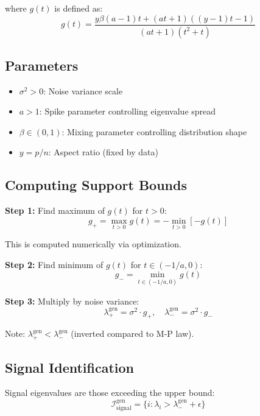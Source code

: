 \documentclass[12pt,a4paper]{article}
\begin{document}
where $g(t)$ is defined as:
\begin{equation}
g(t) = \frac{y\beta(a-1)t + (at+1)((y-1)t-1)}{(at+1)(t^2+t)}
\end{equation}

\subsection{Parameters}

\begin{itemize}
    \item $\sigma^2 > 0$: Noise variance scale
    \item $a > 1$: Spike parameter controlling eigenvalue spread
    \item $\beta \in (0, 1)$: Mixing parameter controlling distribution shape
    \item $y = p/n$: Aspect ratio (fixed by data)
\end{itemize}

\subsection{Computing Support Bounds}

\textbf{Step 1:} Find maximum of $g(t)$ for $t > 0$:
\begin{equation}
g_+ = \max_{t > 0} g(t) = -\min_{t > 0} [-g(t)]
\end{equation}

This is computed numerically via optimization.

\textbf{Step 2:} Find minimum of $g(t)$ for $t \in (-1/a, 0)$:
\begin{equation}
g_- = \min_{t \in (-1/a, 0)} g(t)
\end{equation}

\textbf{Step 3:} Multiply by noise variance:
\begin{equation}
\lambda_+^{\text{gen}} = \sigma^2 \cdot g_+, \quad \lambda_-^{\text{gen}} = \sigma^2 \cdot g_-
\end{equation}

Note: $\lambda_+^{\text{gen}} < \lambda_-^{\text{gen}}$ (inverted compared to M-P law).

\subsection{Signal Identification}

Signal eigenvalues are those exceeding the upper bound:
\begin{equation}
\mathcal{I}_{\text{signal}}^{\text{gen}} = \{i : \lambda_i > \lambda_-^{\text{gen}} + \epsilon\}
\end{equation}
\end{document}
